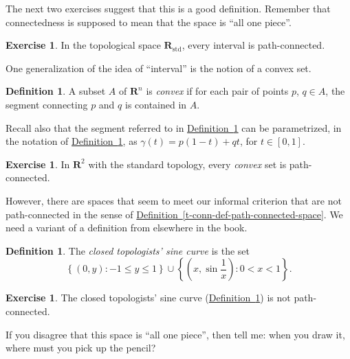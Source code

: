 \documentclass[10pt,]{article}
\theoremstyle{plain}
\theoremstyle{definition}
\newtheorem{definition}[theorem]{Definition}
\newtheorem{exercise}[theorem]{Exercise}
\newcommand{\RR}{\mathbf{R}}
\newcommand{\lt}{ < }
\begin{document}
\par
The next two exercises suggest that this is a good definition. Remember that connectedness is supposed to mean that the space is ``all one piece''.%
\begin{exercise}\label{t-conn-intervals-are-path-connected}
In the topological space \(\RR_{\mathrm{std}}\), every interval is path-connected.%
\end{exercise}
\par
One generalization of the idea of ``interval'' is the notion of a convex set.%
\begin{definition}\label{t-conn-def-convex-set}
A subset \(A\) of \(\RR^n\) is \emph{convex} if for each pair of points \(p\), \(q \in A\), the segment connecting \(p\) and \(q\) is contained in \(A\).%
\end{definition}
\par
Recall also that the segment referred to in \hyperref[t-conn-def-convex-set]{Definition~\ref{t-conn-def-convex-set}} can be parametrized, in the notation of \hyperref[t-conn-def-convex-set]{Definition~\ref{t-conn-def-convex-set}}, as \(\gamma(t) = p(1-t) + qt\), for \(t \in [0, 1]\).%
\begin{exercise}\label{t-conn-convex-sets-are-path-connected}
In \(\RR^2\) with the standard topology, every \emph{convex} set is path-connected.%
\end{exercise}
\par
However, there are spaces that seem to meet our informal criterion that are not path-connected in the sense of \hyperref[t-conn-def-path-connected-space]{Definition~\ref{t-conn-def-path-connected-space}}. We need a variant of a definition from elsewhere in the book.%
\begin{definition}\label{t-conn-def-closed-topologists-sine}
The \emph{closed topologists' sine curve} is the set \[\left\{ (0, y) : -1 \leq y \leq 1 \right\} \cup \left\{ (x, \sin{\frac{1}{x}}) : 0 \lt x \lt 1 \right\}.\]%
\end{definition}
\begin{exercise}\label{t-conn-closed-topologists-sine-not-path-connected}
The closed topologists' sine curve (\hyperref[t-conn-def-closed-topologists-sine]{Definition~\ref{t-conn-def-closed-topologists-sine}}) is not path-connected.%
\end{exercise}
\par
If you disagree that this space is ``all one piece'', then tell me: when you draw it, where must you pick up the pencil?%
\par
\end{document}
